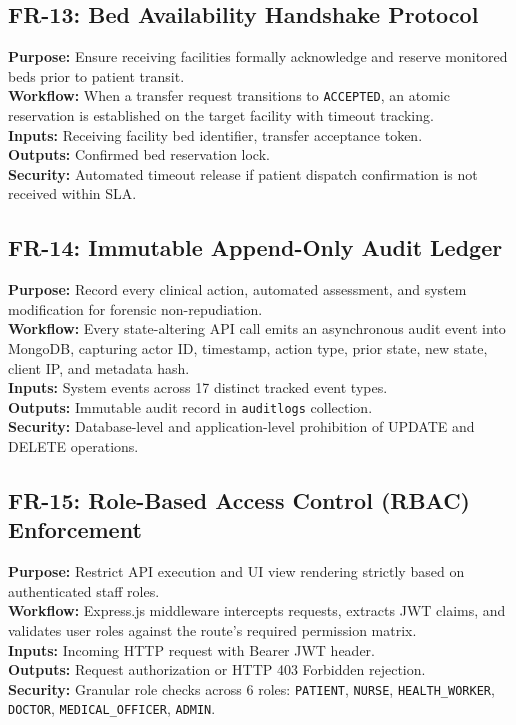 \documentclass[11pt,a4paper,oneside]{report}
\begin{document}
\subsection{FR-13: Bed Availability Handshake Protocol}
\textbf{Purpose:} Ensure receiving facilities formally acknowledge and reserve monitored beds prior to patient transit.\\
\textbf{Workflow:} When a transfer request transitions to \texttt{ACCEPTED}, an atomic reservation is established on the target facility with timeout tracking.\\
\textbf{Inputs:} Receiving facility bed identifier, transfer acceptance token.\\
\textbf{Outputs:} Confirmed bed reservation lock.\\
\textbf{Security:} Automated timeout release if patient dispatch confirmation is not received within SLA.

\subsection{FR-14: Immutable Append-Only Audit Ledger}
\textbf{Purpose:} Record every clinical action, automated assessment, and system modification for forensic non-repudiation.\\
\textbf{Workflow:} Every state-altering API call emits an asynchronous audit event into MongoDB, capturing actor ID, timestamp, action type, prior state, new state, client IP, and metadata hash.\\
\textbf{Inputs:} System events across 17 distinct tracked event types.\\
\textbf{Outputs:} Immutable audit record in \texttt{auditlogs} collection.\\
\textbf{Security:} Database-level and application-level prohibition of UPDATE and DELETE operations.

\subsection{FR-15: Role-Based Access Control (RBAC) Enforcement}
\textbf{Purpose:} Restrict API execution and UI view rendering strictly based on authenticated staff roles.\\
\textbf{Workflow:} Express.js middleware intercepts requests, extracts JWT claims, and validates user roles against the route's required permission matrix.\\
\textbf{Inputs:} Incoming HTTP request with Bearer JWT header.\\
\textbf{Outputs:} Request authorization or HTTP 403 Forbidden rejection.\\
\textbf{Security:} Granular role checks across 6 roles: \texttt{PATIENT}, \texttt{NURSE}, \texttt{HEALTH\_WORKER}, \texttt{DOCTOR}, \texttt{MEDICAL\_OFFICER}, \texttt{ADMIN}.
\end{document}
